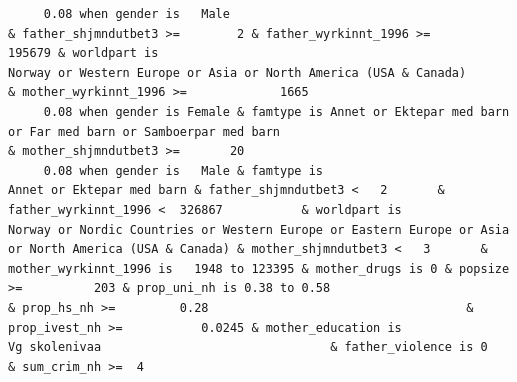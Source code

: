 \documentclass[
  letterpaper,
  DIV=11,
  numbers=noendperiod]{scrreprt}
\begin{document}
\begin{verbatim}
     0.08 when gender is   Male                                                                               & father_shjmndutbet3 >=        2 & father_wyrkinnt_1996 >=           195679 & worldpart is                                                                    Norway or Western Europe or Asia or North America (USA & Canada)                                   & mother_wyrkinnt_1996 >=             1665                                                                                                                                                                                                                                                                                                                                                                                                                                                             
     0.08 when gender is Female & famtype is Annet or Ektepar med barn or Far med barn or Samboerpar med barn                                                                                                                                                                                                                                 & mother_shjmndutbet3 >=       20                                                                                                                                                                                                                                                                                                                                                                                                                                                                                                        
     0.08 when gender is   Male & famtype is                                        Annet or Ektepar med barn & father_shjmndutbet3 <   2       & father_wyrkinnt_1996 <  326867           & worldpart is                              Norway or Nordic Countries or Western Europe or Eastern Europe or Asia or North America (USA & Canada) & mother_shjmndutbet3 <   3       & mother_wyrkinnt_1996 is   1948 to 123395 & mother_drugs is 0 & popsize >=          203 & prop_uni_nh is 0.38 to 0.58                                      & prop_hs_nh >=         0.28                                    & prop_ivest_nh >=           0.0245 & mother_education is                                Vg skolenivaa                                & father_violence is 0                                                                                            & sum_crim_nh >=  4

\end{verbatim}
\end{document}
